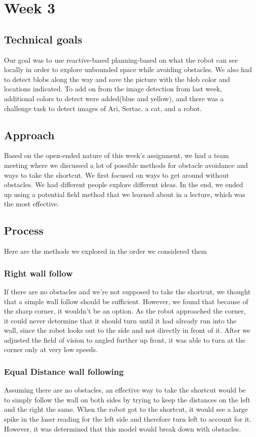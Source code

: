 \documentclass[journal, a4paper]{IEEEtran}
\begin{document}
\section{Week 3}
\subsection{Technical goals}
Our goal was to use reactive-based planning-based on what the robot can see locally in order to explore unbounded space while avoiding obstacles. We also had to detect blobs along the way and save the picture with the blob color and locations indicated. To add on from the image detection from last week, additional colors to detect were added(blue and yellow), and there was a challenge task to detect images of Ari, Sertac, a cat, and a robot. 
\subsection{Approach}
Based on the open-ended nature of this week’s assignment, we had a team meeting where we discussed a lot of possible methods for obstacle avoidance and ways to take the shortcut. We first focused on ways to get around without obstacles. We had different people explore different ideas. In the end, we ended up using a potential field method that we learned about in a lecture, which was the most effective.
\subsection{Process}
Here are the methods we explored in the order we considered them
\subsubsection{Right wall follow}
If there are no obstacles and we’re not supposed to take the shortcut, we thought that a simple wall follow should be sufficient. However, we found that because of the sharp corner, it wouldn’t be an option. As the robot approached the corner, it could never determine that it should turn until it had already run into the wall, since the robot looks out to the side and not directly in front of it. After we adjusted the field of vision to angled further up front, it was able to turn at the corner only at very low speeds. 
\subsubsection{Equal Distance wall following}
Assuming there are no obstacles, an effective way to take the shortcut would be to simply follow the wall on both sides by trying to keep the distances on the left and the right the same. When the robot got to the shortcut, it would see a large spike in the laser reading for the left side and therefore turn left to account for it. However, it was determined that this model would break down with obstacles. 
\end{document}

